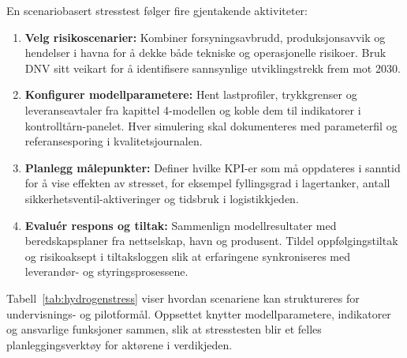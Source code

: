 En scenariobasert stresstest følger fire gjentakende aktiviteter:
\begin{enumerate}
    \item \textbf{Velg risikoscenarier:} Kombiner forsyningsavbrudd, produksjonsavvik og hendelser i havna for å dekke både tekniske og operasjonelle risikoer. Bruk DNV sitt veikart for å identifisere sannsynlige utviklingstrekk frem mot 2030.\citep{dnv2023hydrogenforecast}
    \item \textbf{Konfigurer modellparametere:} Hent lastprofiler, trykkgrenser og leveranseavtaler fra kapittel 4-modellen og koble dem til indikatorer i kontrolltårn-panelet. Hver simulering skal dokumenteres med parameterfil og referansesporing i kvalitetsjournalen.
    \item \textbf{Planlegg målepunkter:} Definer hvilke KPI-er som må oppdateres i sanntid for å vise effekten av stresset, for eksempel fyllingsgrad i lagertanker, antall sikkerhetsventil-aktiveringer og tidsbruk i logistikkjeden.
    \item \textbf{Evaluér respons og tiltak:} Sammenlign modellresultater med beredskapsplaner fra nettselskap, havn og produsent. Tildel oppfølgingstiltak og risikoaksept i tiltaksloggen slik at erfaringene synkroniseres med leverandør- og styringsprosessene.
\end{enumerate}

Tabell~\ref{tab:hydrogenstress} viser hvordan scenariene kan struktureres for undervisnings- og pilotformål. Oppsettet knytter modellparametere, indikatorer og ansvarlige funksjoner sammen, slik at stresstesten blir et felles planleggingsverktøy for aktørene i verdikjeden.

